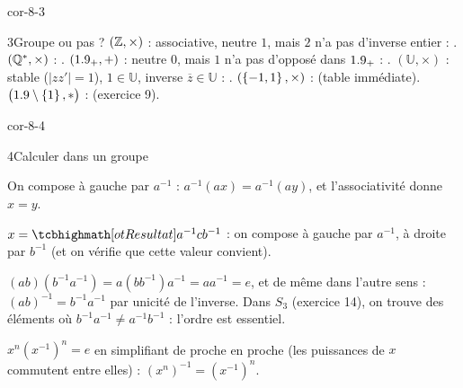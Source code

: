 \begin{blocLivre}{cor-8-3}
\begin{corrige}{3}{Groupe ou pas ?}
$(\mathbb{Z},\times)$ : associative, neutre $1$, mais $2$ n'a pas d'inverse entier :
. $(\mathbb{Q}^{*},\times)$ : .
$(1.9_{+},+)$ : neutre $0$, mais $1$ n'a pas d'opposé dans $1.9_{+}$ :
. $(\mathbb{U},\times)$ : stable
($|zz'|=1$), $1\in\mathbb{U}$, inverse $\overline{z}\in\mathbb{U}$ :
. $(\left\{-1,1\right\},\times)$ :  (table
immédiate). $\bigl(1.9\setminus\left\{1\right\},*\bigr)$ : 
(exercice 9).
\end{corrige}
\end{blocLivre}

\begin{blocLivre}{cor-8-4}
\begin{corrige}{4}{Calculer dans un groupe}
\begin{questions}
  \item On compose à gauche par $a^{-1}$ :
    $a^{-1}(ax)=a^{-1}(ay)$, et l'associativité donne $x=y$.
  \item $x=\res{a^{-1}cb^{-1}}$ : on compose à gauche par $a^{-1}$, à
    droite par $b^{-1}$ (et on vérifie que cette valeur convient).
  \item $(ab)(b^{-1}a^{-1})=a(bb^{-1})a^{-1}=aa^{-1}=e$, et de même dans
    l'autre sens : $(ab)^{-1}=b^{-1}a^{-1}$ par unicité de l'inverse.
    Dans $S_3$ (exercice 14), on trouve des éléments où
    $b^{-1}a^{-1}\neq a^{-1}b^{-1}$ : l'ordre est essentiel.
  \item $x^{n}(x^{-1})^{n}=e$ en simplifiant de proche en proche (les
    puissances de $x$ commutent entre elles) : $(x^{n})^{-1}=(x^{-1})^{n}$.
\end{questions}
\end{corrige}
\end{blocLivre}

